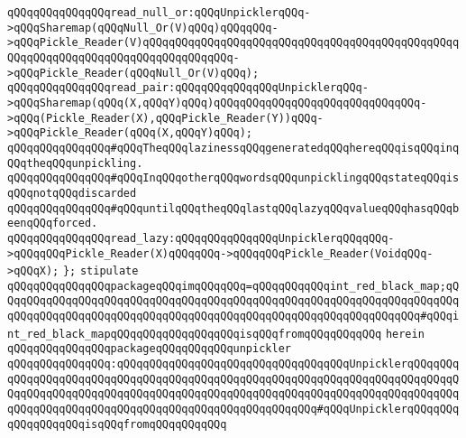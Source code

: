 \verb|qQQqqQQqqQQqqQQqread_null_or:qQQqUnpicklerqQQq->qQQqSharemap(qQQqNull_Or(V)qQQq)qQQqqQQq->qQQqPickle_Reader(V)qQQqqQQqqQQqqQQqqQQqqQQqqQQqqQQqqQQqqQQqqQQqqQQqqQQqqQQqqQQqqQQqqQQqqQQqqQQqqQQqqQQq->qQQqPickle_Reader(qQQqNull_Or(V)qQQq);|\newline
\verb|qQQqqQQqqQQqqQQqread_pair:qQQqqQQqqQQqqQQqUnpicklerqQQq->qQQqSharemap(qQQq(X,qQQqY)qQQq)qQQqqQQqqQQqqQQqqQQqqQQqqQQqqQQq->qQQq(Pickle_Reader(X),qQQqPickle_Reader(Y))qQQq->qQQqPickle_Reader(qQQq(X,qQQqY)qQQq);|\newline
\newline
\newline
\verb|qQQqqQQqqQQqqQQq#qQQqTheqQQqlazinessqQQqgeneratedqQQqhereqQQqisqQQqinqQQqtheqQQqunpickling.|\newline
\verb|qQQqqQQqqQQqqQQq#qQQqInqQQqotherqQQqwordsqQQqunpicklingqQQqstateqQQqisqQQqnotqQQqdiscarded|\newline
\verb|qQQqqQQqqQQqqQQq#qQQquntilqQQqtheqQQqlastqQQqlazyqQQqvalueqQQqhasqQQqbeenqQQqforced.|\newline
\newline
\verb|qQQqqQQqqQQqqQQqread_lazy:qQQqqQQqqQQqqQQqUnpicklerqQQqqQQq->qQQqqQQqPickle_Reader(X)qQQqqQQq->qQQqqQQqPickle_Reader(VoidqQQq->qQQqX);|\newline
\verb|};|\newline
\newline
\newline
\newline
\verb|stipulate|\newline
\verb|qQQqqQQqqQQqqQQqpackageqQQqimqQQqqQQq=qQQqqQQqqQQqint_red_black_map;qQQqqQQqqQQqqQQqqQQqqQQqqQQqqQQqqQQqqQQqqQQqqQQqqQQqqQQqqQQqqQQqqQQqqQQqqQQqqQQqqQQqqQQqqQQqqQQqqQQqqQQqqQQqqQQqqQQqqQQqqQQqqQQqqQQqqQQq#qQQqint_red_black_mapqQQqqQQqqQQqqQQqqQQqisqQQqfromqQQqqQQqqQQq|\newline
\verb|herein|\newline
\newline
\verb|qQQqqQQqqQQqqQQqpackageqQQqqQQqqQQqunpickler|\newline
\verb|qQQqqQQqqQQqqQQq:qQQqqQQqqQQqqQQqqQQqqQQqqQQqqQQqqQQqUnpicklerqQQqqQQqqQQqqQQqqQQqqQQqqQQqqQQqqQQqqQQqqQQqqQQqqQQqqQQqqQQqqQQqqQQqqQQqqQQqqQQqqQQqqQQqqQQqqQQqqQQqqQQqqQQqqQQqqQQqqQQqqQQqqQQqqQQqqQQqqQQqqQQqqQQqqQQqqQQqqQQqqQQqqQQqqQQqqQQqqQQqqQQqqQQqqQQqqQQq#qQQqUnpicklerqQQqqQQqqQQqqQQqqQQqisqQQqfromqQQqqQQqqQQq|\newline
